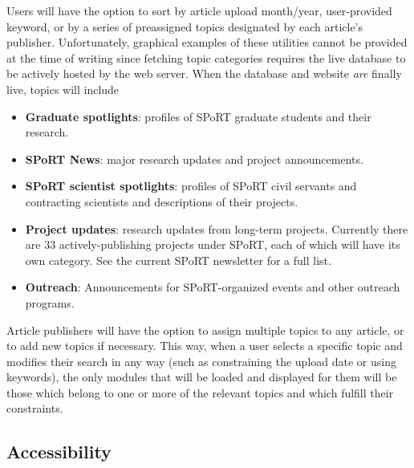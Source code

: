 \documentclass[12pt]{article}
\begin{document}
Users will have the option to sort by article upload month/year, user-provided keyword, or by a series of preassigned topics designated by each article's publisher. Unfortunately, graphical examples of these utilities cannot be provided at the time of writing since fetching topic categories requires the live database to be actively hosted by the web server. When the database and website \textit{are} finally live, topics will include

\begin{itemize}
  \item{\textbf{Graduate spotlights}: profiles of SPoRT graduate students and their research.}
  \item{\textbf{SPoRT News}: major research updates and project announcements.}
  \item{\textbf{SPoRT scientist spotlights}: profiles of SPoRT civil servants and contracting scientists and descriptions of their projects.}
  \item{\textbf{Project updates}: research updates from long-term projects. Currently there are 33 actively-publishing projects under SPoRT, each of which will have its own category. See the current SPoRT newsletter \cite{sportnewsletter20} for a full list.}
  \item{\textbf{Outreach}: Announcements for SPoRT-organized events and other outreach programs.}
\end{itemize}

Article publishers will have the option to assign multiple topics to any article, or to add new topics if necessary. This way, when a  user selects a specific topic and modifies their search in any way (such as constraining the upload date or using keywords), the only modules that will be loaded and displayed for them will be those which belong to one or more of the relevant topics and which fulfill their constraints.

\subsection{Accessibility}
\label{accessibility}
\end{document}
